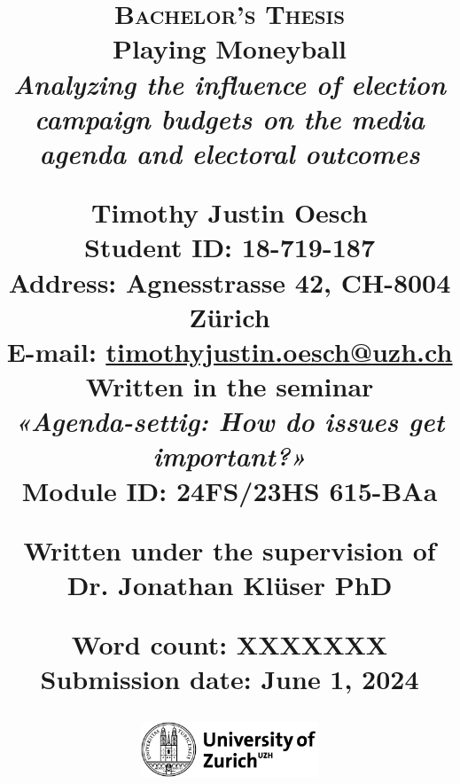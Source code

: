 \begin{titlepage}
\title{
    \raggedright
    \small
    \textsc{Bachelor's Thesis} \\
    \vspace{0.5cm}
    \fontsize{25pt}{25pt}
    \textbf{Playing Moneyball}\\
    \vspace{0.2cm}
    \Large\textit{Analyzing the influence of election campaign budgets on the media agenda and electoral outcomes} \\
    
    \vspace{1cm}

    \textbf{Timothy Justin Oesch }\\
    \vspace{0.25cm}
    \normalsize
    \textbf{Student ID:} 18-719-187\\
    \textbf{Address:} Agnesstrasse 42, CH-8004 Zürich\\
    \textbf{E-mail:} \href{mailto:timothyjustin.oesch@uzh.ch}{\underline{timothyjustin.oesch@uzh.ch}}\\
    
    \vspace{0.5cm} 
    Written in the seminar\\
    \textit{«Agenda-settig: How do issues get important?»}\\
    Module ID: 24FS/23HS 615-BAa
    
    \vspace{0.5cm}
    Written under the supervision of\\
    \textbf{Dr. Jonathan Klüser PhD}

    
    
    \vspace{0.25cm}
    \scriptsize{
        Word count: XXXXXXX \\
        Submission date: June 1, 2024
    } \\
    
    \date{}
    \begin{figure}[b]
        \centering
        \includegraphics[width=200px]{LaTeX/partials/01.1_uzh_logo.png}
    \end{figure}
}
\clearpage\maketitle
\thispagestyle{empty}
\end{titlepage}